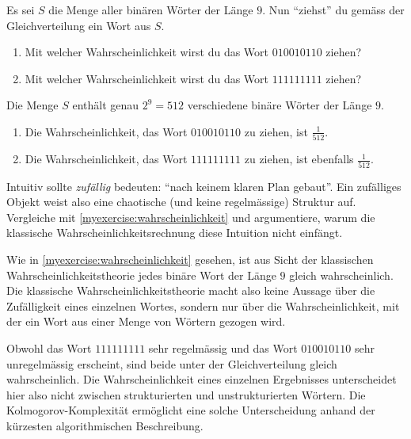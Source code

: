 \begin{myexercise}\label{myexercise:wahrscheinlichkeit}
	Es sei $S$ die Menge aller binären Wörter der Länge $9$. Nun \enquote{ziehst} du gemäss der Gleichverteilung ein Wort aus $S$.
	\begin{enumerate}
		\item Mit welcher Wahrscheinlichkeit wirst du das Wort $010010110$ ziehen?
		\item Mit welcher Wahrscheinlichkeit wirst du das Wort $111111111$ ziehen?
	\end{enumerate}
	\begin{myanswer}
		Die Menge $S$ enthält genau $2^9 = 512$ verschiedene binäre Wörter der Länge $9$.
		\begin{enumerate}
			\item Die Wahrscheinlichkeit, das Wort $010010110$ zu ziehen, ist $\frac{1}{512}$.
			\item Die Wahrscheinlichkeit, das Wort $111111111$ zu ziehen, ist ebenfalls $\frac{1}{512}$.
		\end{enumerate}
	\end{myanswer}
\end{myexercise}

\begin{myexercise}
	Intuitiv sollte \textit{zufällig} bedeuten: \enquote{nach keinem klaren Plan gebaut}. Ein zufälliges Objekt weist also eine chaotische (und keine regelmässige) Struktur auf. Vergleiche mit \cref{myexercise:wahrscheinlichkeit} und argumentiere, warum die klassische Wahrscheinlichkeitsrechnung diese Intuition nicht einfängt.
\begin{myanswer}
	Wie in \cref{myexercise:wahrscheinlichkeit} gesehen, ist aus Sicht der klassischen Wahrscheinlichkeitstheorie jedes binäre Wort der Länge $9$ gleich wahrscheinlich. Die klassische Wahrscheinlichkeitstheorie macht also keine Aussage über die Zufälligkeit eines einzelnen Wortes, sondern nur über die Wahrscheinlichkeit, mit der ein Wort aus einer Menge von Wörtern gezogen wird.
	
	Obwohl das Wort $111111111$ sehr regelmässig und das Wort $010010110$ sehr unregelmässig erscheint, sind beide unter der Gleichverteilung gleich wahrscheinlich. Die Wahrscheinlichkeit eines einzelnen Ergebnisses unterscheidet hier also nicht zwischen strukturierten und unstrukturierten Wörtern. Die Kolmogorov-Komplexität ermöglicht eine solche Unterscheidung anhand der kürzesten algorithmischen Beschreibung.
\end{myanswer}
\end{myexercise}

